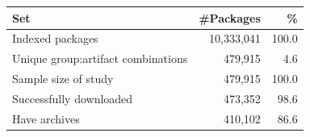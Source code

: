 \small
\begin{tabular}{@{}lrr@{}}
    \toprule
    \textbf{Set} & \textbf{\#Packages} & {\bf \%} \\ \midrule
    Indexed packages& 10,333,041 & 100.0 \\
    Unique group:artifact combinations& 479,915 & 4.6 \\
    \midrule
    Sample size of study& 479,915 & 100.0 \\%
    Successfully downloaded& 473,352 & 98.6 \\
    Have archives& 410,102 & 86.6 \\
    \bottomrule
\end{tabular}

